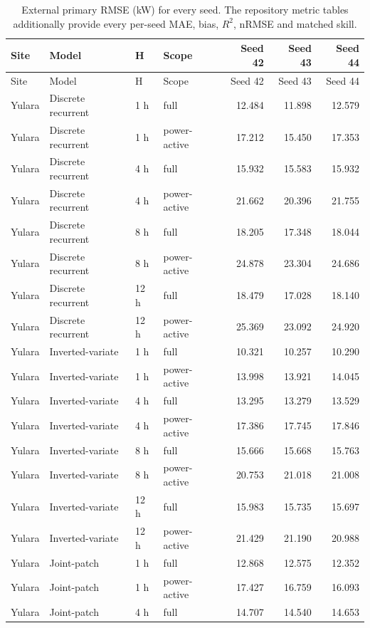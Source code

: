 \begin{longtable}{llllrrr}
\caption{External primary RMSE (kW) for every seed. The repository metric tables additionally provide every per-seed MAE, bias, $R^2$, nRMSE and matched skill.}\label{tabs:externalseeds}\\
\toprule Site & Model & H & Scope & Seed 42 & Seed 43 & Seed 44\\\midrule
\endfirsthead\toprule Site & Model & H & Scope & Seed 42 & Seed 43 & Seed 44\\\midrule\endhead
Yulara & Discrete recurrent & 1 h & full & 12.484 & 11.898 & 12.579\\
Yulara & Discrete recurrent & 1 h & power-active & 17.212 & 15.450 & 17.353\\
Yulara & Discrete recurrent & 4 h & full & 15.932 & 15.583 & 15.932\\
Yulara & Discrete recurrent & 4 h & power-active & 21.662 & 20.396 & 21.755\\
Yulara & Discrete recurrent & 8 h & full & 18.205 & 17.348 & 18.044\\
Yulara & Discrete recurrent & 8 h & power-active & 24.878 & 23.304 & 24.686\\
Yulara & Discrete recurrent & 12 h & full & 18.479 & 17.028 & 18.140\\
Yulara & Discrete recurrent & 12 h & power-active & 25.369 & 23.092 & 24.920\\
Yulara & Inverted-variate & 1 h & full & 10.321 & 10.257 & 10.290\\
Yulara & Inverted-variate & 1 h & power-active & 13.998 & 13.921 & 14.045\\
Yulara & Inverted-variate & 4 h & full & 13.295 & 13.279 & 13.529\\
Yulara & Inverted-variate & 4 h & power-active & 17.386 & 17.745 & 17.846\\
Yulara & Inverted-variate & 8 h & full & 15.666 & 15.668 & 15.763\\
Yulara & Inverted-variate & 8 h & power-active & 20.753 & 21.018 & 21.008\\
Yulara & Inverted-variate & 12 h & full & 15.983 & 15.735 & 15.697\\
Yulara & Inverted-variate & 12 h & power-active & 21.429 & 21.190 & 20.988\\
Yulara & Joint-patch & 1 h & full & 12.868 & 12.575 & 12.352\\
Yulara & Joint-patch & 1 h & power-active & 17.427 & 16.759 & 16.093\\
Yulara & Joint-patch & 4 h & full & 14.707 & 14.540 & 14.653\\

\end{longtable}
